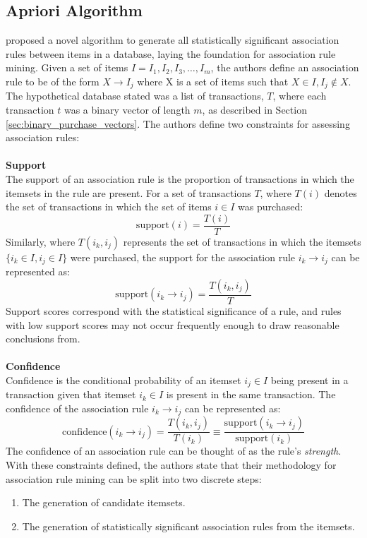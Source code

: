 \subsection{Apriori Algorithm}
\label{sec:apriori}
 proposed a novel algorithm to generate all statistically significant association rules between items in a database, laying the foundation for association rule mining. Given a set of items $I = I_1, I_2, I_3,\dots,I_m$, the authors define an association rule to be of the form $X \rightarrow I_j$ where X is a set of items such that $X \in I, I_j \notin X$.  The hypothetical database stated was a list of transactions, $T$, where each transaction $t$ was a binary vector of length $m$, as described in Section \ref{sec:binary_purchase_vectors}. The authors define two constraints for assessing association rules:
\\\\\textbf{Support}\\
The support of an association rule is the proportion of transactions in which the itemsets in the rule are present. For a set of transactions $T$, where $T(i)$ denotes the set of transactions in which the set of items $i \in I$ was purchased:
\[
\text{support}(i) = \frac{T(i)}{T} 
\]
Similarly, where $T{(i_k, i_j)}$ represents the set of transactions in which the itemsets $\{i_k \in I, i_j\in I\}$ were purchased, the support for the association rule $i_k \rightarrow i_j$ can be represented as:
\[
\text{support}(i_k \rightarrow i_j) = \frac{T(i_k, i_j)}{T} 
\]
Support scores correspond with the statistical significance of a rule, and rules with low support scores may not occur frequently enough to draw reasonable conclusions from.
\\\\\textbf{Confidence}\\
Confidence is the conditional probability of an itemset $i_j \in I$ being present in a transaction given that itemset $i_k \in I$ is present in the same transaction. The confidence of the association rule $i_k \rightarrow i_j$ can be represented as:
\[
\text{confidence}(i_k \rightarrow i_j) = \frac{T(i_k, i_j)}{T(i_k)} \equiv \frac{\text{support}(i_k \rightarrow i_j)}{\text{support}(i_k)}
\]
The confidence of an association rule can be thought of as the rule's \textit{strength}.
\\With these constraints defined, the authors state that their methodology for association rule mining can be split into two discrete steps:
\begin{enumerate}
\item The generation of candidate itemsets.
\item The generation of statistically significant association rules from the itemsets.
\end{enumerate}
